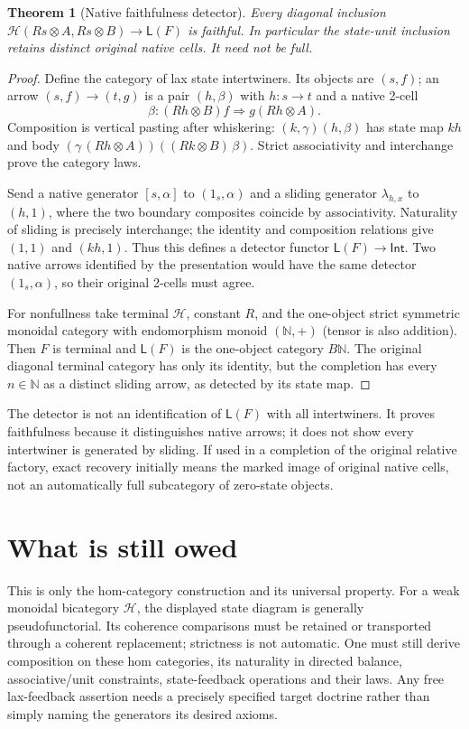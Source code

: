 \documentclass[11pt]{article}
\newtheorem{theorem}{Theorem}
\begin{document}
\begin{theorem}[Native faithfulness detector]
Every diagonal inclusion $\mathcal H(Rs\otimes A,Rs\otimes B)\to\mathsf L(F)$ is faithful. In particular the state-unit inclusion retains distinct original native cells. It need not be full.
\end{theorem}
\begin{proof}
Define the category of lax state intertwiners. Its objects are $(s,f)$; an arrow $(s,f)\to(t,g)$ is a pair $(h,\beta)$ with $h:s\to t$ and a native 2-cell
\[
 \beta:(Rh\otimes B)f\Rightarrow g(Rh\otimes A).
\]
Composition is vertical pasting after whiskering: $(k,\gamma)(h,\beta)$ has state map $kh$ and body $(\gamma\, (Rh\otimes A))((Rk\otimes B)\,\beta)$. Strict associativity and interchange prove the category laws.

Send a native generator $[s,\alpha]$ to $(1_s,\alpha)$ and a sliding generator $\lambda_{h,x}$ to $(h,1)$, where the two boundary composites coincide by associativity. Naturality of sliding is precisely interchange; the identity and composition relations give $(1,1)$ and $(kh,1)$. Thus this defines a detector functor $\mathsf L(F)\to\mathsf{Int}$. Two native arrows identified by the presentation would have the same detector $(1_s,\alpha)$, so their original 2-cells must agree.

For nonfullness take terminal $\mathcal H$, constant $R$, and the one-object strict symmetric monoidal category with endomorphism monoid $(\mathbb N,+)$ (tensor is also addition). Then $F$ is terminal and $\mathsf L(F)$ is the one-object category $B\mathbb N$. The original diagonal terminal category has only its identity, but the completion has every $n\in\mathbb N$ as a distinct sliding arrow, as detected by its state map.
\end{proof}

The detector is not an identification of $\mathsf L(F)$ with all intertwiners. It proves faithfulness because it distinguishes native arrows; it does not show every intertwiner is generated by sliding. If used in a completion of the original relative factory, exact recovery initially means the marked image of original native cells, not an automatically full subcategory of zero-state objects.

\section{What is still owed}
This is only the hom-category construction and its universal property. For a weak monoidal bicategory $\mathcal H$, the displayed state diagram is generally pseudofunctorial. Its coherence comparisons must be retained or transported through a coherent replacement; strictness is not automatic. One must still derive composition on these hom categories, its naturality in directed balance, associative/unit constraints, state-feedback operations and their laws. Any free lax-feedback assertion needs a precisely specified target doctrine rather than simply naming the generators its desired axioms.
\end{document}
